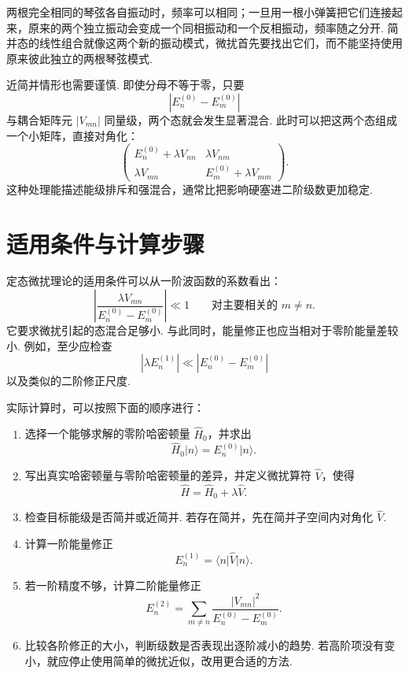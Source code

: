 \documentclass[UTF8,11pt,a4paper,openany]{ctexbook}
\newcommand{\ket}[1]{\lvert #1\rangle}\newcommand{\bra}[1]{\langle #1\rvert}
\begin{document}
\begin{analogybox}
两根完全相同的琴弦各自振动时，频率可以相同；一旦用一根小弹簧把它们连接起来，原来的两个独立振动会变成一个同相振动和一个反相振动，频率随之分开. 简并态的线性组合就像这两个新的振动模式，微扰首先要找出它们，而不能坚持使用原来彼此独立的两根琴弦模式. 
\end{analogybox}

近简并情形也需要谨慎. 即使分母不等于零，只要
\[
|E_n^{(0)}-E_m^{(0)}|
\]
与耦合矩阵元 $|V_{mn}|$ 同量级，两个态就会发生显著混合. 此时可以把这两个态组成一个小矩阵，直接对角化：
\[
\begin{pmatrix}
E_n^{(0)}+\lambda V_{nn} & \lambda V_{nm}\\
\lambda V_{mn} & E_m^{(0)}+\lambda V_{mm}
\end{pmatrix}.
\]
这种处理能描述能级排斥和强混合，通常比把影响硬塞进二阶级数更加稳定. 

\section{适用条件与计算步骤}

定态微扰理论的适用条件可以从一阶波函数的系数看出：
\[
\left|
\frac{\lambda V_{mn}}
{E_n^{(0)}-E_m^{(0)}}
\right|
\ll1
\qquad
\text{对主要相关的 }m\ne n.
\]
它要求微扰引起的态混合足够小. 与此同时，能量修正也应当相对于零阶能量差较小. 例如，至少应检查
\[
|\lambda E_n^{(1)}|\ll |E_n^{(0)}-E_m^{(0)}|
\]
以及类似的二阶修正尺度. 

实际计算时，可以按照下面的顺序进行：

\begin{enumerate}
\item 选择一个能够求解的零阶哈密顿量 $\hat H_0$，并求出
\[
\hat H_0\ket n=E_n^{(0)}\ket n.
\]

\item 写出真实哈密顿量与零阶哈密顿量的差异，并定义微扰算符 $\hat V$，使得
\[
\hat H=\hat H_0+\lambda\hat V.
\]

\item 检查目标能级是否简并或近简并. 若存在简并，先在简并子空间内对角化 $\hat V$. 

\item 计算一阶能量修正
\[
E_n^{(1)}=\bra n\hat V\ket n.
\]

\item 若一阶精度不够，计算二阶能量修正
\[
E_n^{(2)}
=
\sum_{m\ne n}
\frac{|V_{mn}|^2}
{E_n^{(0)}-E_m^{(0)}}.
\]

\item 比较各阶修正的大小，判断级数是否表现出逐阶减小的趋势. 若高阶项没有变小，就应停止使用简单的微扰近似，改用更合适的方法. 
\end{enumerate}
\end{document}
